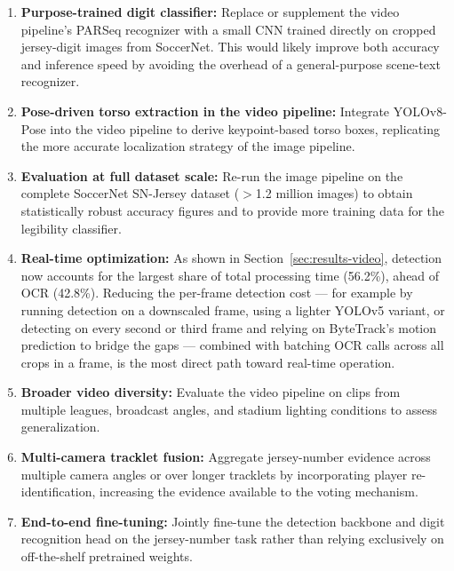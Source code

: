 \begin{enumerate}
    \item \textbf{Purpose-trained digit classifier:} Replace or
    supplement the video pipeline's PARSeq recognizer with a small CNN
    trained directly on cropped jersey-digit images from SoccerNet. This
    would likely improve both accuracy and inference speed by avoiding
    the overhead of a general-purpose scene-text recognizer.

    \item \textbf{Pose-driven torso extraction in the video pipeline:}
    Integrate YOLOv8-Pose into the video pipeline to derive keypoint-based
    torso boxes, replicating the more accurate localization strategy of
    the image pipeline.

    \item \textbf{Evaluation at full dataset scale:} Re-run the image
    pipeline on the complete SoccerNet SN-Jersey dataset ($>$1.2 million
    images) to obtain statistically robust accuracy figures and to
    provide more training data for the legibility classifier.

    \item \textbf{Real-time optimization:} As shown in
    Section~\ref{sec:results-video}, detection now accounts for the
    largest share of total processing time (56.2\%), ahead of OCR
    (42.8\%). Reducing the per-frame detection cost --- for example by
    running detection on a downscaled frame, using a lighter YOLOv5
    variant, or detecting on every second or third frame and relying on
    ByteTrack's motion prediction to bridge the gaps --- combined with
    batching OCR calls across all crops in a frame, is the most direct
    path toward real-time operation.

    \item \textbf{Broader video diversity:} Evaluate the video pipeline
    on clips from multiple leagues, broadcast angles, and stadium
    lighting conditions to assess generalization.

    \item \textbf{Multi-camera tracklet fusion:} Aggregate jersey-number
    evidence across multiple camera angles or over longer tracklets
    by incorporating player re-identification, increasing the evidence
    available to the voting mechanism.

    \item \textbf{End-to-end fine-tuning:} Jointly fine-tune the
    detection backbone and digit recognition head on the jersey-number
    task rather than relying exclusively on off-the-shelf pretrained
    weights.
\end{enumerate}


